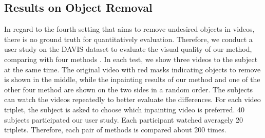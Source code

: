 \subsection{Results on Object Removal}


In regard to the fourth setting that aims to remove undesired objects in videos, there is no ground truth for quantitatively evaluation. Therefore,
we conduct a user study on the DAVIS dataset to evaluate the visual quality of our method, comparing with four methods \cite{nazeri2019edgeconnect,wang2019video,Kim_2019_CVPR1,Xu_2019_CVPR}.
%
In each test, we show three videos to the subject at the same time. The original video with red masks indicating objects to remove is shown in the middle, while the inpainting results of our method and one of the other four method are shown on the two sides in a random order.
%  
The subjects can watch the videos repeatedly to better evaluate the differences.
For each video triplet, the subject is asked to choose which inpainting video is preferred.
40 subjects participated our user study. 
Each participant watched averagely 20 triplets. 
Therefore, each pair of methods is compared about 200 times.

%



